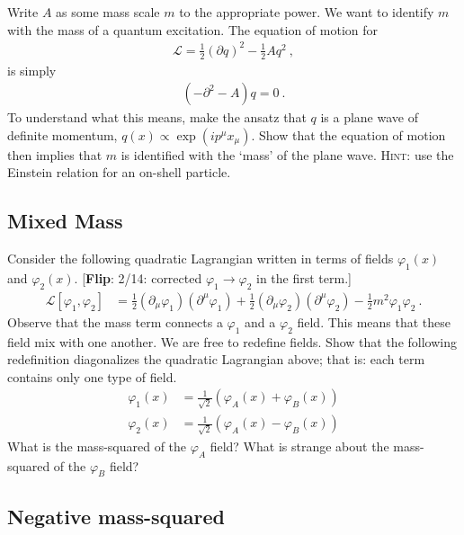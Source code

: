 \documentclass[12pt]{article}
\newcommand{\flip}[1]{{\color{red} [\textbf{Flip}: {#1}]}}
\begin{document}
Write $A$ as some mass scale $m$ to the appropriate power. We want to identify $m$ with the mass of a quantum excitation. The equation of motion for
\begin{align}
	\mathcal L = \frac 12\left(\partial q\right)^2 - \frac 12 A q^2 \ ,
\end{align}
is simply
\begin{align}
	(-\partial^2 - A) q = 0 \ .
\end{align}
To understand what this means, make the ansatz that $q$ is a plane wave of definite momentum, $q(x)\propto \exp(ip^\mu x_\mu)$. Show that the equation of motion then implies that $m$ is identified with the `mass' of the plane wave. \textsc{Hint}: use the Einstein relation for an on-shell particle.



\subsection{Mixed Mass}

Consider the following quadratic Lagrangian written in terms of fields $\varphi_1(x)$ and $\varphi_2(x)$. \flip{2/14: corrected $\varphi_1 \to \varphi_2$ in the first term.}
\begin{align}
	\mathcal L[\varphi_1, \varphi_2] &=
	\frac{1}{2}\left(\partial_\mu\varphi_1\right)
	\left(\partial^\mu\varphi_1\right)
	+
	\frac{1}{2}\left(\partial_\mu\varphi_2\right)
	\left(\partial^\mu\varphi_2\right)
	- \frac 12 m^2\varphi_1\varphi_2 \ .
\end{align}
Observe that the mass term connects a $\varphi_1$ and a $\varphi_2$ field. This means that these field mix with one another. We are free to redefine fields. Show that the following redefinition diagonalizes the quadratic Lagrangian above; that is: each term contains only one type of field.
\begin{align}
	\varphi_1(x) &= \frac{1}{\sqrt{2}}\left(\varphi_A(x) + \varphi_B(x) \right)
	\\
	\varphi_2(x) &= \frac{1}{\sqrt{2}}\left(\varphi_A(x) - \varphi_B(x) \right)
\end{align}
What is the mass-squared of the $\varphi_A$ field? What is strange about the mass-squared of the $\varphi_B$ field?

\subsection{Negative mass-squared}
\end{document}
